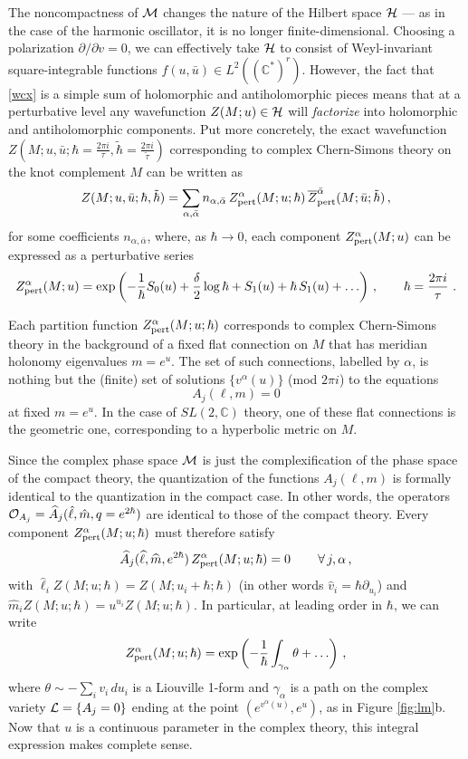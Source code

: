 \documentclass[letterpaper,12pt]{article}
\numberwithin{equation}{section}
\newcommand{\ol}{\overline}
\newcommand{\be}{\begin{equation}}
\newcommand{\ee}{\end{equation}}
\newcommand{\pd}{\partial}
\newcommand{\C}{{\mathbb{C}}}
\newcommand{\CH}{{\cal H}}
\newcommand{\CL}{{\cal L}}
\newcommand{\CM}{{\cal M}}
\newcommand{\CO}{{\cal O}}
\renewcommand{\=}{\;=\;}
\begin{document}
The noncompactness of $\CM$ changes the nature of the Hilbert space $\CH$ --- as in the case of the harmonic oscillator, it is no longer finite-dimensional. Choosing a polarization $\pd/\pd v=0$, we can effectively take $\CH$ to  consist of Weyl-invariant square-integrable functions $f(u,\bar{u}) \in L^2((\C^*)^{r})$. However, the fact that \eqref{wcx} is a simple sum of holomorphic and antiholomorphic pieces means that at a perturbative level any wavefunction $Z(M;u)\in\CH$ will \emph{factorize} into holomorphic and antiholomorphic components. Put more concretely, the exact wavefunction $Z(M;u,\bar{u};\hbar=\frac{2\pi i}{\tau},\tilde{\hbar}=\frac{2\pi i}{\tilde{\tau}})$ corresponding to complex Chern-Simons theory on the knot complement $M$ can be written as \cite{DGLZ, Wit-anal}
%
\be Z(M;u,\bar{u};\hbar,\tilde{\hbar}) = \sum_{\alpha,\bar{\alpha}} n_{\alpha,\bar{\alpha}}\, Z^\alpha_{\rm pert}(M;u;\hbar)\, \ol{Z}^{\bar{\alpha}}_{\rm pert}(M;\bar{u};\tilde{\hbar})\,, \label{sumGc}\ee
%
for some coefficients $n_{\alpha,\bar{\alpha}}$, where, as $\hbar\to 0$, each component $Z^\alpha_{\rm pert}(M;u)$ can be expressed as a perturbative series
%
\be  Z^\alpha_{\rm pert}(M;u) = \exp\left( -\frac{1}{\hbar}S_0(u) +\frac{\delta}{2}\log\hbar+S_1(u)+ \hbar\,S_1(u)+\ldots\right)\,,\qquad \hbar = \frac{2\pi i}{\tau}\,\,. \label{Zcxpert} \ee


Each partition function $Z^\alpha_{\rm pert}(M;u;\hbar)$ corresponds to complex Chern-Simons theory in the background of a fixed flat connection on $M$ that has meridian holonomy eigenvalues $m=e^u$. The set of such connections, labelled by $\alpha$, is nothing but the (finite) set of solutions
$\{v^\alpha(u)\}$ (mod $2\pi i$) to the equations
%
\be A_j(\ell,m) = 0 \ee
%
at fixed $m=e^u$. In the case of $SL(2,\C)$ theory, one of these flat connections is the geometric one, corresponding to a hyperbolic metric on $M$.

Since the complex phase space $\CM$ is just the complexification of the phase space of the compact theory, the quantization of the functions $A_j(\ell,m)$ is formally identical to the quantization in the compact case. In other words, the operators $\CO_{A_j}=\widehat{A}_j(\hat{\ell},\hat{m},q=e^{2\hbar})$ are identical to those of the compact theory. Every component $Z^\alpha_{\rm pert}(M;u;\hbar)$ must therefore satisfy \cite{gukov-2003, DGLZ}
%
\be \widehat{A}_j(\widehat{\ell},\widehat{m},e^{2\hbar})\,Z^\alpha_{\rm pert}(M;u;\hbar) = 0\,\qquad \forall\,j,\alpha\,,  \label{Acx} \ee
%
with $\widehat{\ell}_iZ(M;u;\hbar) = Z(M;u_i+\hbar;\hbar)$ (in other words $\widehat{v}_i=\hbar\pd_{u_i}$) and $\widehat{m}_iZ(M;u;\hbar) = u^{u_i}Z(M;u;\hbar)$.
In particular, at leading order in $\hbar$, we can write
%
\be Z^\alpha_{\rm pert}(M;u;\hbar) = \exp\left(-\frac{1}{\hbar}\int_{\gamma_\alpha} \theta +\ldots\right)\,, \label{Zcts} \ee
%
where $\theta \sim - \sum_iv_i\,du_i$ is a Liouville 1-form and $\gamma_\alpha$
is a path on the complex variety $\CL = \{ A_j=0\}$
ending at the point $(e^{v^\alpha(u)},e^u)$, as in Figure \ref{fig:lm}b.
Now that $u$ is a continuous parameter in the complex theory, this integral expression makes complete sense.
\end{document}
